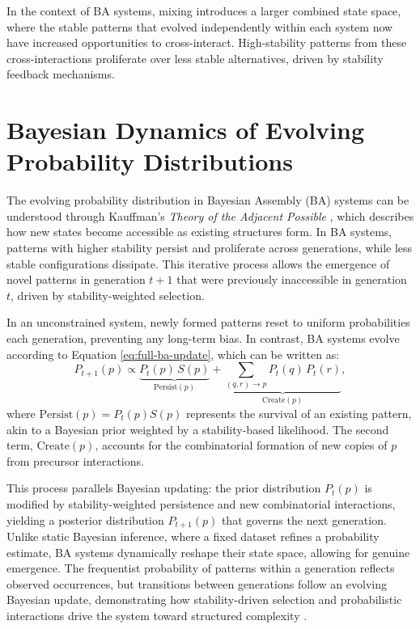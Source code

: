 \documentclass[entropy,article,submit,pdftex,moreauthors]{Definitions/mdpi}
\begin{document}
In the context of BA systems, mixing introduces a larger combined state space, where the stable patterns that evolved independently within each system now have increased opportunities to cross-interact. High-stability patterns from these cross-interactions proliferate over less stable alternatives, driven by stability feedback mechanisms.

\section{Bayesian Dynamics of Evolving Probability Distributions}

The evolving probability distribution in Bayesian Assembly (BA) systems can be understood through Kauffman's \emph{Theory of the Adjacent Possible} \cite{kauffman2000investigations, kauffman2024tap}, which describes how new states become accessible as existing structures form. In BA systems, patterns with higher stability persist and proliferate across generations, while less stable configurations dissipate. This iterative process allows the emergence of novel patterns in generation \( t+1 \) that were previously inaccessible in generation \( t \), driven by stability-weighted selection.

In an unconstrained system, newly formed patterns reset to uniform probabilities each generation, preventing any long-term bias. In contrast, BA systems evolve according to Equation \ref{eq:full-ba-update}, which can be written as:
\begin{equation}
P_{t+1}(p) \propto \underbrace{P_t(p)\,S(p)}_{\text{Persist}(p)} + \underbrace{\sum_{(q,r)\to p} P_t(q)\,P_t(r)}_{\text{Create}(p)},
\end{equation}
where \( \text{Persist}(p) = P_t(p) S(p) \) represents the survival of an existing pattern, akin to a Bayesian prior weighted by a stability-based likelihood. The second term, \( \text{Create}(p) \), accounts for the combinatorial formation of new copies of $p$ from precursor interactions.

This process parallels Bayesian updating: the prior distribution \( P_t(p) \) is modified by stability-weighted persistence and new combinatorial interactions, yielding a posterior distribution \( P_{t+1}(p) \) that governs the next generation. Unlike static Bayesian inference, where a fixed dataset refines a probability estimate, BA systems dynamically reshape their state space, allowing for genuine emergence. The frequentist probability of patterns within a generation reflects observed occurrences, but transitions between generations follow an evolving Bayesian update, demonstrating how stability-driven selection and probabilistic interactions drive the system toward structured complexity \cite{le2020equation}.
\end{document}
